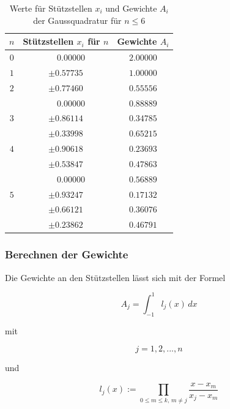 \begin{table}
    \centering
    \begin{tabular}{|c|c|c|}
        \hline
        $n$ & Stützstellen $x_{i}$ für $n$ & Gewichte $A_{i}$\\
        \hline
        $0$ & $ \phantom{-} 0.00000 $ & $ 2.00000 $ \\
        \hline
        $1$ & $ \pm 0.57735 $ & $ 1.00000 $ \\
        \hline
        $2$ & $ \pm 0.77460 $ & $ 0.55556 $ \\
            & $ \phantom{-} 0.00000 $ & $ 0.88889 $ \\
        \hline
        $3$ & $ \pm 0.86114 $ & $ 0.34785 $ \\
            & $ \pm 0.33998 $ & $ 0.65215 $ \\
        \hline
        $4$ & $ \pm 0.90618 $ & $ 0.23693 $ \\
            & $ \pm 0.53847 $ & $ 0.47863 $ \\
            & $ \phantom{-} 0.00000 $ & $ 0.56889 $ \\
        \hline
        $5$ & $ \pm 0.93247 $ & $ 0.17132 $ \\
            & $ \pm 0.66121 $ & $ 0.36076 $ \\
            & $ \pm 0.23862 $ & $ 0.46791 $ \\
        \hline
    \end{tabular}
    \caption{Werte für Stützstellen $x_{i}$ und Gewichte $A_{i}$ der Gaussquadratur für $n \leq 6$
    \label{buch:table:gaussgewichtwerte}}    
\end{table}

\subsubsection{Berechnen der Gewichte}
Die Gewichte an den Stützstellen lässt sich mit der Formel

\begin{equation*}
    A_{j} = \int_{-1}^{1} l_j(x) \, dx
\end{equation*}

mit

\begin{equation*}
    j = 1, 2, ... , n
\end{equation*}

und 

\begin{equation}
    l_{j}(x) := \prod_{0 \leq m \leq k, \, m \neq j} \frac{x - x_{m}}{x_{j} - x_{m}}
\end{equation}

